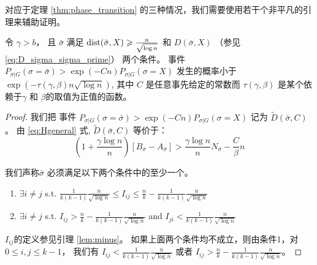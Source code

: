   对应于定理 \ref{thm:phase_transition} 的三种情况，我们需要使用若干个非平凡的引理来辅助证明。

  \begin{lemma}\label{lem:sigmaX}
    令 $\gamma > b$， 且 $\bar{\sigma}$ 满足 $\operatorname{dist}(\bar{\sigma}, X) \geqslant \frac{n}{\sqrt{\log n}}$
    和 $D(\bar{\sigma}, X)$
    （参见\eqref{eq:D_sigma_sigma_prime}）
    两个条件。
    事件
    $P_{\sigma | G}(\sigma = \bar{\sigma} ) > \exp(-Cn) P_{\sigma | G}(\sigma = X)$
    发生的概率小于 $\exp(-\tau(\gamma,\beta) n \sqrt{\log  n} )$,
    其中 $C$ 是任意事先给定的常数而 
    $\tau(\gamma,\beta)$
   是某个依赖于$\gamma$ 和 $\beta$的取值为正值的函数。
  \end{lemma}
  \begin{proof}
    我们把 事件 $P_{\sigma | G}(\sigma = \bar{\sigma} ) > \exp(-Cn) P_{\sigma | G}(\sigma = X)$
    记为 $\widetilde{D}(\bar{\sigma}, C)$。
    由 \eqref{eq:Hgeneral} 式, $\widetilde{D}(\bar{\sigma}, C)$
    等价于：
  \begin{equation}\label{eq:BwA}
    (1 + \frac{\gamma \log n}{n})[B_{\bar{\sigma}} - A_{\bar{\sigma}}] >  \frac{\gamma \log n}{n} N_{\bar{\sigma}}  - \frac{C}{\beta} n
    \end{equation}  
    
    我们声称$\bar{\sigma}$  必须满足以下两个条件中的至少一个。
    \begin{enumerate}
      \item $\exists i\neq j$ s.t. $\frac{1}{k(k-1)}\frac{n}{\sqrt{\log n}} \leq I_{ij} \leq \frac{n}{k} - \frac{1}{k(k-1)}\frac{n}{\sqrt{\log n}}$
      \item $\exists i \neq j$ s.t. $I_{ij} > \frac{n}{k} - \frac{1}{k(k-1)}\frac{n}{\sqrt{\log n}}$ and $I_{ji} < \frac{1}{k(k-1)}\frac{n}{\sqrt{\log n}}$
    \end{enumerate}
    $I_{ij}$的定义参见引理
    \ref{lem:minus}。
    如果上面两个条件均不成立，则由条件1，对 $0 \leq i,j\leq k-1$，
    我们有
    $I_{ij} < \frac{1}{k(k-1)}\frac{n}{\sqrt{\log n}}$
    或者 $I_{ij} > \frac{n}{k} - \frac{1}{k(k-1)}\frac{n}{\sqrt{\log n}}$。
    

\end{proof}
